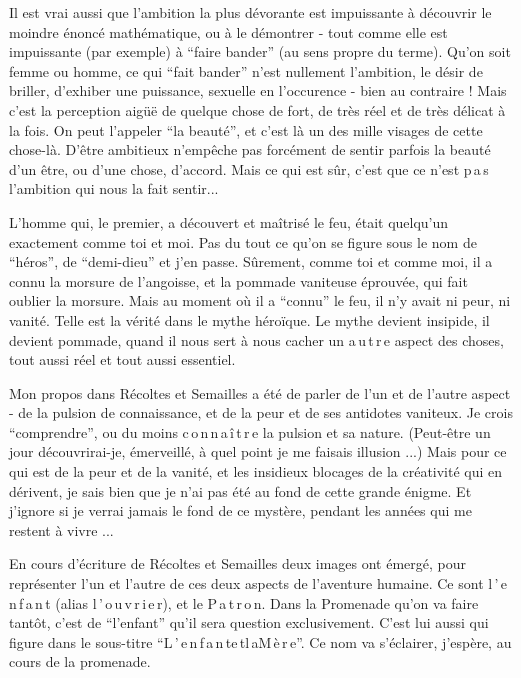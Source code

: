 Il est vrai aussi que l'ambition la plus dévorante est impuissante à découvrir le moindre énoncé mathématique, ou à le démontrer - tout comme elle est impuissante (par exemple) à ``faire bander'' (au sens propre du terme). Qu'on soit femme ou homme, ce qui ``fait bander'' n'est nullement l'ambition, le désir de briller, d'exhiber une puissance, sexuelle en l'occurence - bien au contraire ! Mais c'est la perception aigüë de quelque chose de fort, de très réel et de très délicat à la fois. On peut l'appeler ``la beauté'', et c'est là un des mille visages de cette chose-là. D'être ambitieux n'empêche pas forcément de sentir parfois la beauté d'un être, ou d'une chose, d'accord. Mais ce qui est sûr, c'est que ce n'est p\,a\,s l'ambition qui nous la fait sentir...

L'homme qui, le premier, a découvert et maîtrisé le feu, était quelqu'un exactement comme toi et moi. Pas du tout ce qu'on se figure sous le nom de ``héros'', de ``demi-dieu'' et j'en passe. Sûrement, comme toi et comme moi, il a connu la morsure de l'angoisse, et la pommade vaniteuse éprouvée, qui fait oublier la morsure. Mais au moment où il a ``connu'' le feu, il n'y avait ni peur, ni vanité. Telle est la vérité dans le mythe héroïque. Le mythe devient insipide, il devient pommade, quand il nous sert à nous cacher un a\,u\,t\,r\,e aspect des choses, tout aussi réel et tout aussi essentiel.

Mon propos dans Récoltes et Semailles a été de parler de l'un et de l'autre aspect - de la pulsion de connaissance, et de la peur et de ses antidotes vaniteux. Je crois ``comprendre'', ou du moins c\,o\,n\,n\,a\,î\,t\,r\,e la pulsion et sa nature. (Peut-être un jour découvrirai-je, émerveillé, à quel point je me faisais illusion ...) Mais pour ce qui est de la peur et de la vanité, et les insidieux blocages de la créativité qui en dérivent, je sais bien que je n'ai pas été au fond de cette grande énigme. Et j'ignore si je verrai jamais le fond de ce mystère, pendant les années qui me restent à vivre ...

En cours d'écriture de Récoltes et Semailles deux images ont émergé, pour représenter l'un et l'autre de ces deux aspects de l'aventure humaine. Ce sont l\,'\,e\,n\,f\,a\,n\,t (alias l\,'\,o\,u\,v\,r\,i\,e\,r), et le P\,a\,t\,r\,o\,n. Dans la Promenade qu'on va faire tantôt, c'est de ``l'enfant'' qu'il sera question  exclusivement. C'est lui aussi qui figure dans le sous-titre ``L\,'\,e\,n\,f\,a\,n\,t\quad e\,t\quad l\,a\quad M\,è\,r\,e''. Ce nom va s'éclairer, j'espère, au cours de la promenade.

